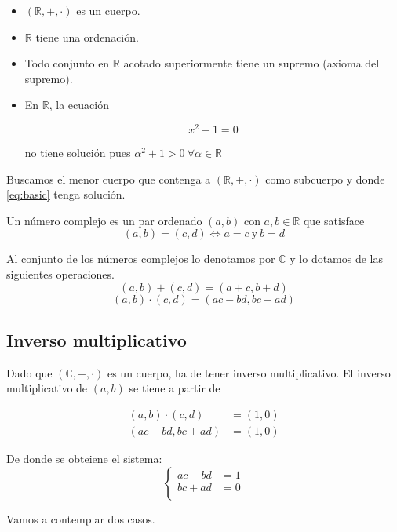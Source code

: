\documentclass{apuntes}
\begin{document}
\begin{itemize}
\item $(\mathbb{R}, +, \cdot)$ es un cuerpo.
\item $\mathbb{R}$ tiene una ordenación.
\item Todo conjunto en $\mathbb{R}$ acotado superiormente tiene un supremo (axioma del supremo).
\item En $\mathbb{R}$, la ecuación

\begin{equation} \label{eq:basic}
x^2+1=0
\end{equation}

no tiene solución pues $\alpha^2+1>0 \ \forall \alpha \in \mathbb{R}$
\end{itemize}
Buscamos el menor cuerpo que contenga a $(\mathbb{R}, +, \cdot)$ como subcuerpo y donde \eqref{eq:basic} tenga solución.

\begin{defn}
Un número complejo es un par ordenado $(a,b)$ con $a,b\in\mathbb{R}$ que satisface
\[(a,b)=(c,d) \iff a=c\ \text{y} \ b=d\]

Al conjunto de los números complejos lo denotamos por $\mathbb{C}$ y lo dotamos de las siguientes operaciones.
\[(a,b)+(c,d) = (a+c, b+d)\]
\[(a,b)\cdot(c,d) = (ac-bd, bc+ad)\]
\end{defn}

\subsection{Inverso multiplicativo}

Dado que $(\mathbb{C}, +, \cdot)$ es un cuerpo, ha de tener inverso multiplicativo. El inverso multiplicativo de $(a,b)$ se tiene a partir de

\begin{align*}
    (a,b)\cdot(c,d) & = (1,0)\\
    (ac-bd, bc+ad) & = (1,0)
\end{align*}

De donde se obteiene el sistema:
\[
\left\{
\begin{array}{cc}
    ac-bd & = 1\\
    bc+ad & = 0\\
\end{array}
\right.
\]

Vamos a contemplar dos casos.
\end{document}
